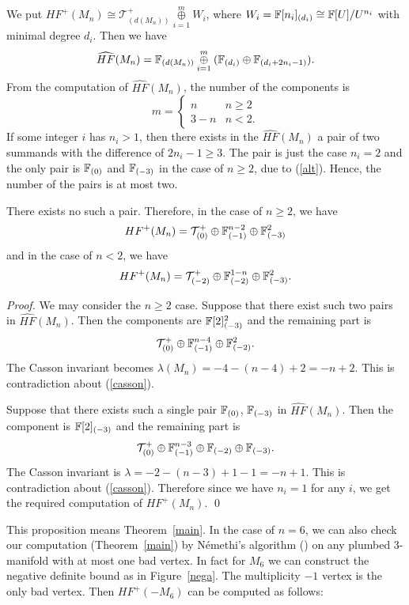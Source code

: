 \documentclass[11pt]{amsart}
\begin{document}
We put $HF^+(M_n)\cong {\mathcal T}^+_{(d(M_n))}\overset{m}{\underset{i=1}{\oplus}} W_i$, where $W_i={\Bbb F}[n_i]_{(d_i)}\cong {\Bbb F}[U]/U^{n_i}$
with minimal degree $d_i$.
Then we have
$$\widehat{HF}(M_n)={\Bbb F}_{(d(M_n))}\overset{m}{\underset{i=1}{\oplus}}({\Bbb F}_{(d_i)}\oplus{\Bbb F}_{(d_i+2n_i-1)}).$$
From the computation of $\widehat{HF}(M_n)$, the number of the components is
$$m=\begin{cases}n&n\ge 2\\3-n&n<2.\end{cases}$$
If some integer $i$ has $n_i>1$, then there exists in the $\widehat{HF}(M_n)$ a pair of two summands with the difference of $2n_i-1\ge 3$.
The pair is just the case $n_i=2$ and the only pair is ${\Bbb F}_{(0)}$ and ${\Bbb F}_{(-3)}$ in the case of $n\ge 2$,
due to (\ref{alt}).
Hence, the number of the pairs is at most two.
\begin{prop}
There exists no such a pair.
Therefore, in the case of $n\ge 2$, we have
$$HF^+(M_n)={\mathcal T}^+_{(0)}\oplus {\Bbb F}_{(-1)}^{n-2}\oplus{\Bbb F}_{(-3)}^2$$
and in the case of $n<2$, we have
$$HF^+(M_n)={\mathcal T}^+_{(-2)}\oplus {\Bbb F}_{(-2)}^{1-n}\oplus{\Bbb F}_{(-3)}^2.$$
\end{prop}
\begin{proof}
We may consider the $n\ge 2$ case.
Suppose that there exist such two pairs in $\widehat{HF}(M_n)$.
Then the components are ${\Bbb F}[2]_{(-3)}^2$ and the remaining part is 
$${\mathcal T}^+_{(0)}\oplus{\Bbb F}_{(-1)}^{n-4}\oplus{\Bbb F}_{(-2)}^2.$$
The Casson invariant becomes $\lambda(M_n)=-4-(n-4)+2=-n+2$.
This is contradiction about (\ref{casson}).

Suppose that there exists such a single pair ${\Bbb F}_{(0)}$, ${\Bbb F}_{(-3)}$ in $\widehat{HF}(M_n)$.
Then the component is ${\Bbb F}[2]_{(-3)}$ and the remaining part is 
$${\mathcal T}^+_{(0)}\oplus{\Bbb F}_{(-1)}^{n-3}\oplus{\Bbb F}_{(-2)}\oplus{\Bbb F}_{(-3)}.$$
The Casson invariant is $\lambda=-2-(n-3)+1-1=-n+1$.
This is contradiction about (\ref{casson}).
Therefore since we have $n_i=1$ for any $i$, we get the required computation of $HF^+(M_n)$.
\qed
\end{proof}
This proposition means Theorem~\ref{main}.
In the case of $n=6$, we can also check our computation (Theorem~\ref{main}) by N\'emethi's algorithm (\cite{N}) on any plumbed 3-manifold with at most one bad vertex.
In fact for $M_6$ we can construct the negative definite bound as in Figure~\ref{nega}.
The multiplicity $-1$ vertex is the only bad vertex.
Then $HF^+(-M_6)$ can be computed as follows:
\end{document}
